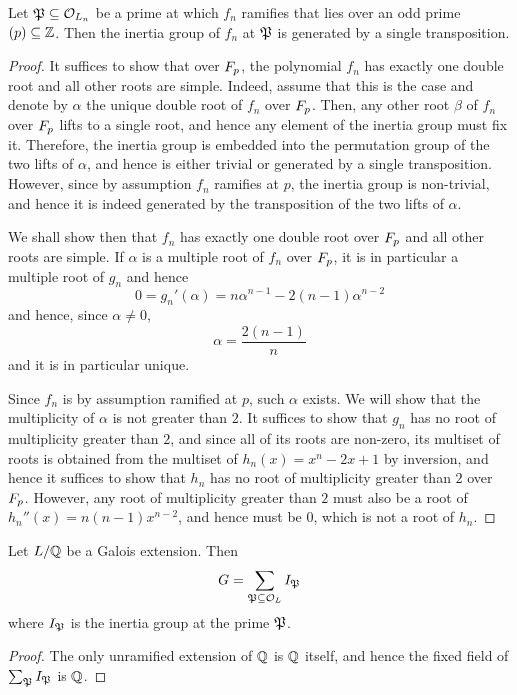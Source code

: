 \documentclass[../main.tex]{subfiles}
\begin{document}
\begin{lemma}
  Let $\P \subseteq \O_{L_n}$ be a prime at which $f_n$ ramifies that lies over an odd prime $\left( p \right) \subseteq \Z$.
  Then the inertia group of $f_n$ at $\P$ is generated by a single transposition.
\end{lemma}
\begin{proof}
  It suffices to show that over $\F_p$, the polynomial $f_n$ has exactly one double root and all other roots are simple.
  Indeed, assume that this is the case and denote by $\alpha$ the unique double root of $f_n$ over $\F_p$.
  Then, any other root $\beta$ of $f_n$ over $\F_p$ lifts to a single root, and hence any element of the inertia group must fix it.
  Therefore, the inertia group is embedded into the permutation group of the two lifts of $\alpha$, and hence is either trivial or generated by a single transposition.
  However, since by assumption $f_n$ ramifies at $p$, the inertia group is non-trivial, and hence it is indeed generated by the transposition of the two lifts of $\alpha$.
  
  We shall show then that $f_n$ has exactly one double root over $\F_p$ and all other roots are simple.
  If $\alpha$ is a multiple root of $f_n$ over $\F_p$, it is in particular a multiple root of $g_n$ and hence
  \[
    0 = g_n'\left( \alpha \right) = n \alpha^{n-1} - 2\left( n - 1 \right) \alpha^{n-2} 
  \]
  and hence, since $\alpha \neq 0$,
  \[
    \alpha = \frac{2\left( n - 1 \right)}{n}
  \]
  and it is in particular unique.
  
  Since $f_n$ is by assumption ramified at $p$, such $\alpha$ exists.
  We will show that the multiplicity of $\alpha$ is not greater than $2$.
  It suffices to show that $g_n$ has no root of multiplicity greater than $2$, and since all of its roots are non-zero, its multiset of roots is obtained from the multiset of $h_n\left( x \right) = x^n - 2x + 1$ by inversion, and hence it suffices to show that $h_n$ has no root of multiplicity greater than $2$ over $\F_p$.
  However, any root of multiplicity greater than $2$ must also be a root of $h_n''\left( x \right) = n\left( n - 1 \right)x^{n-2}$, and hence must be $0$, which is not a root of $h_n$.
\end{proof}
\begin{lemma}
  Let $L/ \Q$ be a Galois extension.
  Then 
  \[
    G = \sum_{\P \subseteq \O_L} I_{\P}
  \]
  where $I_{\P}$ is the inertia group at the prime $\P$.
\end{lemma}
\begin{proof}
  The only unramified extension of $\Q$ is $\Q$ itself, and hence the fixed field of $\sum_{\P} I_{\P}$ is $\Q$.
\end{proof}
\end{document}
